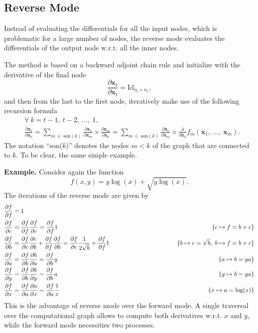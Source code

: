 \subsection{Reverse Mode}

Instead of evaluating the differentials for all the input nodes, which
is problematic for a large number of nodes, the reverse mode evaluates
the differentials of the output node w.r.t. all the inner nodes.

The method is based on a backward adjoint chain rule and initialize with
the derivative of the final node
\[
 \frac{\partial\bm{x}_{t}}{\partial\bm{x}_{t}} =
 \text{Id}_{n_{t} \times n_{t}},
\]
and then from the last to the first node, iteratively make use of the
following recursion formula
\begin{align*}
 &\forall~k = t - 1,~t - 2,~\dots,~1,\\
 &\frac{\partial\bm{x}_{t}}{\partial\bm{x}_{k}} =
  \sum_{m~\in~\text{son}(k)}
  \frac{\partial\bm{x}_{t}}{\partial\bm{x}_{m}}\times
  \frac{\partial\bm{x}_{m}}{\partial\bm{x}_{k}} =
  \sum_{m~\in~\text{son}(k)}
  \frac{\partial\bm{x}_{t}}{\partial\bm{x}_{m}}\times
  \frac{\partial}{\partial\bm{x}_{k}}
  f_{m}(\bm{x}_{1},~\dots,~\bm{x}_{m}).
\end{align*}
The notation ``son(\(k\))'' denotes the nodes \(m < k\) of the graph
that are connected to \(k\). To be clear, the same simple example.

\noindent\textbf{Example.}\hspace{.5cm}
Consider again the function
\[
  f(x, y) = y\log(x) + \sqrt{y\log(x)}.
\]
The iterations of the reverse mode are given by
\begin{align*}
 \frac{\partial f}{\partial f} &= 1\\
 \frac{\partial f}{\partial c} &=
 \frac{\partial f}{\partial f} \frac{\partial f}{\partial c} =
 \frac{\partial f}{\partial f} 1\qquad &\{c \mapsto f = b + c\}\\
 \frac{\partial f}{\partial b} &=
 \frac{\partial f}{\partial c} \frac{\partial c}{\partial b} +
 \frac{\partial f}{\partial f} \frac{\partial f}{\partial b} =
 \frac{\partial f}{\partial c} \frac{1}{2\sqrt{b}} +
 \frac{\partial f}{\partial f} 1\qquad
 &\{b \mapsto c = \sqrt{b},~b \mapsto f = b + c\}\\
 \frac{\partial f}{\partial a} &=
 \frac{\partial f}{\partial b} \frac{\partial b}{\partial a} =
 \frac{\partial f}{\partial b} y\qquad &\{a \mapsto b = ya\}\\
 \frac{\partial f}{\partial y} &=
 \frac{\partial f}{\partial b} \frac{\partial b}{\partial y} =
 \frac{\partial f}{\partial b} a \qquad &\{y \mapsto b = ya\}\\
 \frac{\partial f}{\partial x} &=
 \frac{\partial f}{\partial a} \frac{\partial a}{\partial x} =
 \frac{\partial f}{\partial a} \frac{1}{x} \hspace{6.5cm}
 &\{x \mapsto a = \log(x)\}
\end{align*}
This is the advantage of reverse mode over the forward mode. A single
traversal over the computational graph allows to compute both
derivatives w.r.t. \(x\) and \(y\), while the forward mode necessities
two processes.

